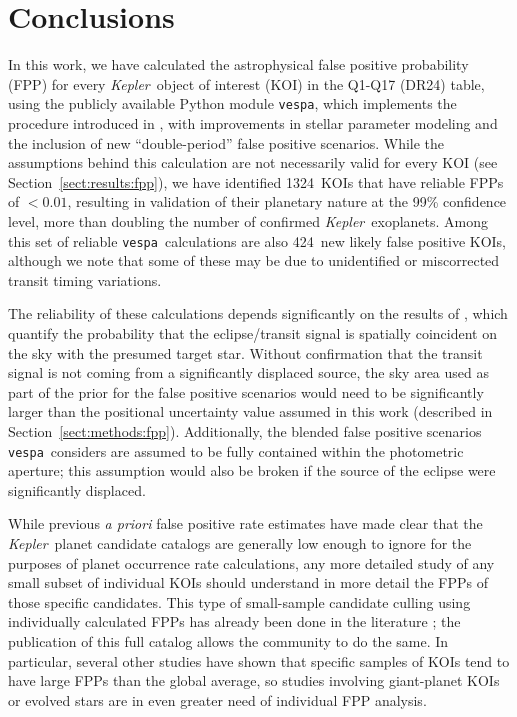 \documentclass{emulateapj}
\newcommand{\sectionname}{Section}
\newcommand{\Sect}[1]{\sectionname~\ref{sect:#1}}
\newcommand{\sect}[1]{\Sect{#1}}
\newcommand{\sectlabel}[1]{\label{sect:#1}}
\newcommand{\nvalnew}{1324} %
\newcommand{\nfpnew}{424}  %
\newcommand{\kepler}{\textit{Kepler}}
\newcommand{\vespa}{\texttt{vespa}}
\begin{document}

\section{Conclusions}
\sectlabel{conclusions}

In this work, we have calculated the astrophysical false positive
probability (FPP) for every \kepler\ object of interest (KOI) in the
Q1-Q17 (DR24) table, using the publicly available Python module
\vespa, which implements the procedure introduced in
\citet{Morton:2012}, with improvements in stellar parameter modeling
and the inclusion of new ``double-period'' false positive scenarios.
While the assumptions behind this calculation are not necessarily
valid for every KOI (see \sect{results:fpp}), we have identified
\nvalnew\ KOIs that have reliable FPPs of $< 0.01$, resulting in
validation of their planetary nature at the 99\% confidence level,
more than doubling the number of confirmed \kepler\ exoplanets.  Among
this set of reliable \vespa\ calculations are also \nfpnew\ new likely
false positive KOIs, although we note that some of these may be due to
unidentified or miscorrected transit timing variations.  

The reliability of these calculations depends significantly on the
results of \citet{Bryson:KSCI}, which quantify the probability that
the eclipse/transit signal is spatially coincident on the sky with the
presumed target star.  Without confirmation that the transit signal is
not coming from a significantly displaced source, the sky area used as
part of the prior for the false positive scenarios would need to be
significantly larger than the positional uncertainty value assumed in
this work (described in \sect{methods:fpp}).  Additionally, the
blended false positive scenarios \vespa\ considers are assumed to be
fully contained within the photometric aperture; this assumption would
also be broken if the source of the eclipse were significantly
displaced.

While previous \emph{a priori} false positive rate estimates
\citep{Morton:2011b,Fressin:2013} have made clear that the \kepler\
planet candidate catalogs are generally low enough to ignore for the
purposes of planet occurrence rate calculations, any more detailed
study of any small subset of individual KOIs should understand in more
detail the FPPs of those specific candidates.  This type of small-sample 
candidate culling using individually calculated FPPs has
already been done in the literature
\citep{MortonSwift:2014,MortonWinn:2014}; the publication of this full
catalog allows the community to do the same.  In particular, several
other studies have shown that specific samples of KOIs tend to have
large FPPs than the global average, so studies involving giant-planet
KOIs \citep{Santerne:2015} or evolved stars \citep{Sliski:2014} are in
even greater need of individual FPP analysis.
\end{document}
